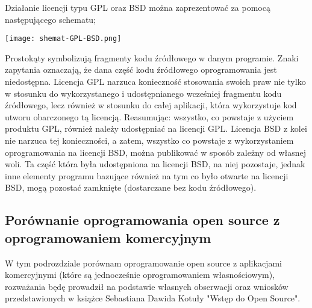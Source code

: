 \documentclass{article}
\begin{document}
Działanie licencji typu GPL oraz BSD można zaprezentować za pomocą następującego schematu;
\begin{center}
        \texttt{[image: shemat-GPL-BSD.png]}
\end{center}
Prostokąty symbolizują fragmenty kodu źródłowego w danym programie. Znaki zapytania oznaczają, że dana część kodu źródłowego oprogramowania jest niedostępna. Licencja GPL narzuca konieczność stosowania swoich praw nie tylko w stosunku do wykorzystanego i udostępnianego wcześniej fragmentu kodu źródłowego, lecz również w stosunku do całej aplikacji, która wykorzystuje kod utworu obarczonego tą licencją.
Reasumując: wszystko, co powstaje z użyciem produktu GPL, również należy udostępniać na licencji GPL. Licencja BSD z kolei nie narzuca tej konieczności, a zatem, wszystko co powstaje z wykorzystaniem oprogramowania na licencji BSD, można publikować w sposób zależny od własnej woli.
Ta część która była udostępniona na licencji BSD, na niej pozostaje, jednak inne elementy programu bazujące również na tym co było otwarte na licencji BSD, mogą pozostać zamknięte (dostarczane bez kodu źródłowego)\cite{Kotula}.

\subsection{Porównanie oprogramowania open source z oprogramowaniem komercyjnym}

W tym podrozdziale porównam oprogramowanie open source z aplikacjami komercyjnymi (które są jednocześnie oprogramowaniem własnościowym), rozważania będę prowadził na podstawie własnych obserwacji oraz wniosków przedstawionych w książce Sebastiana Dawida Kotuły "Wstęp do Open Source"\cite{Kotula}.
\end{document}
